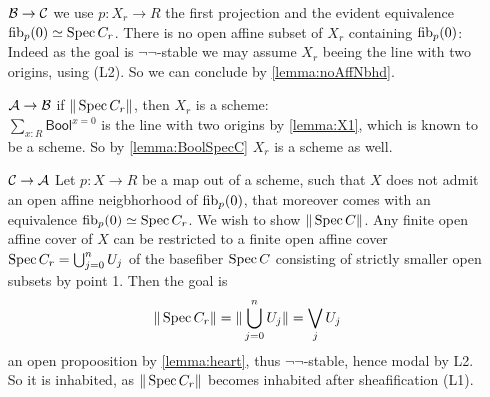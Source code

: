 \documentclass{article}
\newcommand{\Bool}{\mathsf{Bool}}
\begin{document}
\begin{enumerate}
	\item [$\mathcal{B} \rightarrow \mathcal{C}$]
	we use $p : X_r \to R$ the first projection and the evident equivalence $\operatorname{fib}_p(0) \simeq \operatorname{Spec} C_r$.
	There is no open affine subset of $X_r$ containing $\operatorname{fib}_p(0)$: Indeed as the goal is $\lnot \lnot$-stable we may assume $X_r$ beeing the line with two origins, using (L2). So we can conclude by \ref{lemma:noAffNbhd}.
	\item [$\mathcal{A} \rightarrow \mathcal{B}$]
	if $\|\operatorname{Spec} C_r\|$, then $X_r$ is a scheme: \\
	$\sum_{x : R} \Bool^{x = 0}$ is the line with two origins by \ref{lemma:X1}, which is known to be a scheme. So by \ref{lemma:BoolSpecC} $X_r$ is a scheme as well. 
	\item [$\mathcal{C} \rightarrow \mathcal{A}$]
 Let $p : X \to R$ be a map out of a scheme, such that $X$ does not admit an open affine neigbhorhood of $\operatorname{fib}_p(0)$, that moreover comes with an equivalence $\operatorname{fib}_p(0) \simeq \operatorname{Spec} C_r$. We wish to show $\|\operatorname{Spec} C\|$. Any finite open affine cover of $X$ can be restricted to a finite open affine cover $\operatorname{Spec} C_r= \bigcup_{j=0}^{n} U_j$ of the basefiber $\operatorname{Spec} C$ consisting of strictly smaller open subsets by point 1.
	Then the goal is
	\[
	\| \operatorname{Spec} C_r\| = \| \bigcup_{j=0}^{n} U_j \| = \bigvee_j  U_j
	\]
	an open propoosition by \ref{lemma:heart}, thus $\lnot \lnot$-stable, hence modal by L2. So it is inhabited, as $\|\operatorname{Spec} C_r\|$ becomes inhabited after sheafification (L1).
\end{enumerate}
\printbibliography
\end{document}
